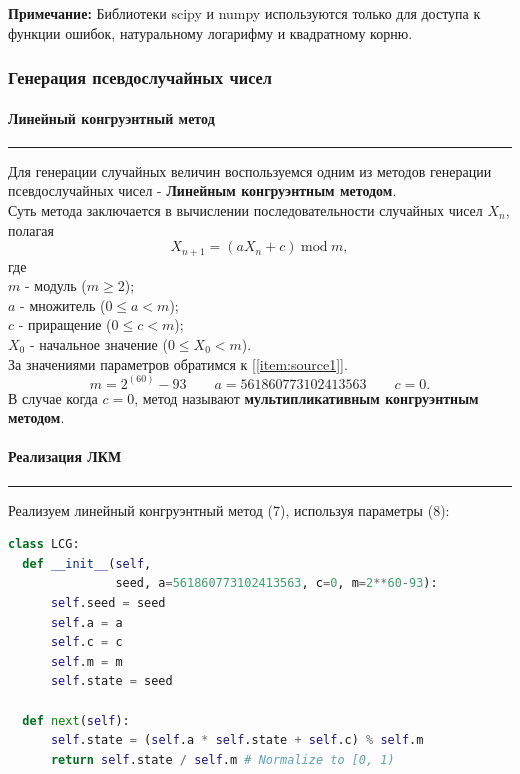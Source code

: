 \documentclass[a4paper, 14pt]{extarticle}
\begin{document}
{\footnotesize \textbf{Примечание:} Библиотеки scipy и numpy используются только 
для доступа к функции ошибок, натуральному логарифму и квадратному корню.}

\subsubsection{Генерация псевдослучайных чисел}

\paragraph{Линейный конгруэнтный метод}\vspace{-20pt}\rule{\linewidth}{0.1mm}

Для генерации случайных величин воспользуемся одним из методов генерации псевдослучайных чисел - 
\textbf{Линейным конгруэнтным методом}.\\
Суть метода заключается в вычислении последовательности случайных чисел $X_n$, полагая
\begin{equation}
  X_{n+1} = (aX_n + c)\hspace{3pt} \text{mod} \hspace{3pt} m, 
\end{equation}
где\\
$m$ - модуль ($m \geq 2$); \\
$a$ - множитель ($0 \leq a < m$); \\
$c$ - приращение ($0 \leq c < m$); \\
$X_0$ - начальное значение ($0 \leq X_0 < m$).\\

За значениями параметров обратимся к [\ref{item:source1}].
\begin{equation}
  m = 2^{(60)} - 93 \qquad a = 561860773102413563 \qquad c = 0.
\end{equation}
В случае когда $c = 0$, метод называют \textbf{мультипликативным конгруэнтным методом}.

\paragraph{Реализация ЛКМ}\vspace{-20pt}\rule{\linewidth}{0.1mm}

Реализуем линейный конгруэнтный метод (7), используя параметры (8):

\begin{center}
  \begin{lstlisting}[language=Python, caption={Реализация ЛКМ}, label={lst:LCG}]
class LCG:
  def __init__(self, 
               seed, a=561860773102413563, c=0, m=2**60-93):
      self.seed = seed
      self.a = a
      self.c = c
      self.m = m
      self.state = seed

  def next(self):
      self.state = (self.a * self.state + self.c) % self.m
      return self.state / self.m # Normalize to [0, 1)
  \end{lstlisting}
\end{center}
\end{document}
